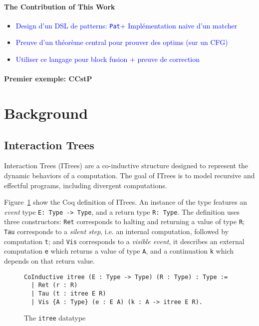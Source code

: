 \documentclass[11pt]{article}
\newcommand{\inlinecoq}[1]{\mbox{\lstinline[style=customcoq,columns=fixed,basewidth=.48em]{#1}}}
\newcommand{\ilc}[1]{\inlinecoq{#1}}
\newcommand{\leon}[1]{\textcolor{blue}{#1}}
\newcommand{\pat}{\texttt{Pat}\xspace}
\begin{document}
\paragraph{The Contribution of This Work}

\begin{itemize}
  \item \leon{Design d'un DSL de patterns: \pat + Implémentation naive d'un matcher}
  \item \leon{Preuve d'un théorème central pour prouver des optims (sur un CFG)}
  \item \leon{Utiliser ce langage pour block fusion + preuve de correction}
\end{itemize}
\paragraph{Premier exemple: CCstP}

\section{Background}
\label{sec:background}

\subsection{Interaction Trees}

Interaction Trees (ITrees) are a co-inductive structure designed to represent the dynamic behaviors of a computation. The goal of ITrees is to model recursive and effectful programs, including divergent computations.

Figure~\ref{fig:itree} show the Coq definition of ITrees. An instance of the type features an \emph{event} type \ilc{E: Type -> Type}, and a return type \ilc{R: Type}. The definition uses three constructors: \ilc{Ret} corresponds to halting and returning a value of type \ilc{R}; \ilc{Tau} corresponds to a \emph{silent step}, i.e. an internal computation, followed by computation \ilc{t}; and \ilc{Vis} corresponds to a \emph{visible event}, it describes an external computation \ilc{e} which returns a value of type \ilc{A}, and a continuation \ilc{k} which depends on that return value.

\begin{figure}
  \begin{lstlisting}[style=customcoq,basicstyle=\small\ttfamily]
CoInductive itree (E : Type -> Type) (R : Type) : Type :=
  | Ret (r : R)
  | Tau (t : itree E R)
  | Vis {A : Type} (e : E A) (k : A -> itree E R).
  \end{lstlisting}
  \caption{The \ilc{itree} datatype}
  \label{fig:itree}
\end{figure}
\end{document}
